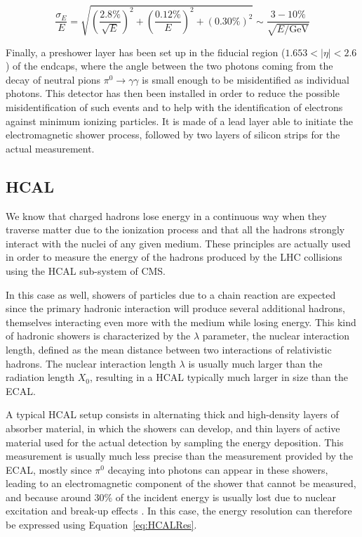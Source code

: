 \documentclass[a4paper, 10pt, openright]{report}
\begin{document}
\begin{equation}
\label{eq:CMSEcal}
\frac{\sigma_E}{E} = \sqrt{\left ( \frac{2.8 \%}{\sqrt{E}} \right)^2 + \left ( \frac{0.12 \%}{E} \right )^2 + (0.30 \%)^2} \sim \frac{3-10\%}{\sqrt{E/\text{GeV}}}
\end{equation}

Finally, a preshower layer has been set up in the fiducial region ($1.653 < |\eta| < 2.6$) of the endcaps, where the angle between the two photons coming from the decay of neutral pions $\pi^0 \rightarrow \gamma \gamma$ is small enough to be misidentified as individual photons. This detector has then been installed in order to reduce the possible misidentification of such events and to help with the identification of electrons against minimum ionizing particles. It is made of a lead layer able to initiate the electromagnetic shower process, followed by two layers of silicon strips for the actual measurement.

\subsection{\acf{HCAL}}\label{subsection:HCAL}

We know that charged hadrons lose energy in a continuous way when they traverse matter due to the ionization process and that all the hadrons strongly interact with the nuclei of any given medium. These principles are actually used in order to measure the energy of the hadrons produced by the \ac{LHC} collisions using the \ac{HCAL} sub-system of \ac{CMS}. 

In this case as well, showers of particles due to a chain reaction are expected since the primary hadronic interaction will produce several additional hadrons, themselves interacting even more with the medium while losing energy. This kind of hadronic showers is characterized by the $\lambda$ parameter, the nuclear interaction length, defined as the mean distance between two interactions of relativistic hadrons. The nuclear interaction length $\lambda$ is usually much larger than the radiation length $X_0$, resulting in a \ac{HCAL} typically much larger in size than the \ac{ECAL}. 

A typical \ac{HCAL} setup consists in alternating thick and high-density layers of absorber material, in which the showers can develop, and thin layers of active material used for the actual detection by sampling the energy deposition. This measurement is usually much less precise than the measurement provided by the \ac{ECAL}, mostly since $\pi^0$ decaying into photons can appear in these showers, leading to an electromagnetic component of the shower that cannot be measured, and because around 30\% of the incident energy is usually lost due to nuclear excitation and break-up effects \cite{Thomson}. In this case, the energy resolution can therefore be expressed using Equation~\ref{eq:HCALRes}.
\end{document}
